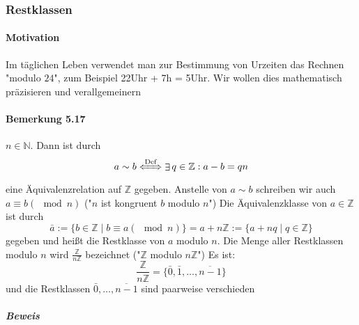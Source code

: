 \documentclass[a4paper]{scrartcl}
\DeclareMathOperator{\Exists}{\exists}
\theoremstyle{definition}
\theoremstyle{plain}
\theoremstyle{plain}
\theoremstyle{remark}
\theoremstyle{remark}
\theoremstyle{remark}
\theoremstyle{remark}
\theoremstyle{remark}
\begin{document}
\subsubsection{Restklassen}
\label{sec-3-1-7}
\paragraph{Motivation}
\label{sec-3-1-7-1}
Im täglichen Leben verwendet man zur Bestimmung von Urzeiten das Rechnen "modulo $24$", zum Beispiel 22Uhr + 7h = 5Uhr. Wir wollen dies mathematisch präzisieren und verallgemeinern
\paragraph{Bemerkung 5.17}
\label{sec-3-1-7-2}
$n\in\mathbb{N}$. Dann ist durch \[a \sim b \xLeftrightarrow{\text{Def}} \Exists q\in\mathbb{Z}:a - b = q n\]
eine Äquivalenzrelation auf $\mathbb{Z}$ gegeben.
Anstelle von $a\sim b$ schreiben wir auch $a\equiv b(\mod n)$ ("$n$ ist kongruent $b$ modulo $n$")
Die Äquivalenzklasse von $a\in \mathbb{Z}$ ist durch
\[\bar a := \{b\in\mathbb{Z}\mid b\equiv a(\mod n)\} = a + n\mathbb{Z} := \{a + n q \mid q\in \mathbb{Z}\}\]
gegeben und heißt die Restklasse von $a$ modulo $n$.
Die Menge aller Restklassen modulo $n$ wird $\frac{\mathbb{Z}}{n\mathbb{Z}}$ bezeichnet ("$\mathbb{Z}$ modulo $n\mathbb{Z}$")
Es ist: \[\frac{\mathbb{Z}}{n\mathbb{Z}} = \{\bar 0, \bar 1, \ldots, \overline{n - 1}\}\]
und die Restklassen $\bar 0, \ldots, \overline{n - 1}$ sind paarweise verschieden
\subparagraph{Beweis}
\label{sec-3-1-7-2-1}
\end{document}

